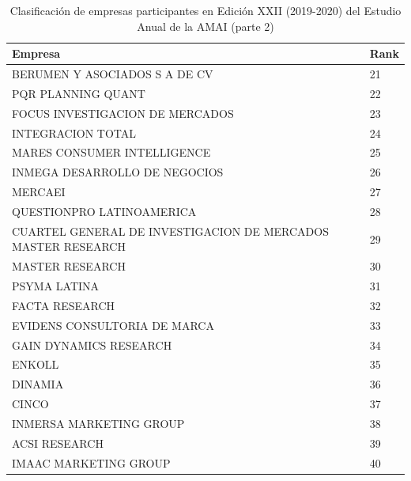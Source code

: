 \begin{table}[]
\caption{Clasificación de empresas participantes en Edición XXII (2019-2020) del Estudio Anual de la AMAI (parte 2)}
\label{tab:clasificación2}
\begin{tabular}{|l|l|}
\hline
Empresa                                                      & Rank \\ \hline
BERUMEN Y ASOCIADOS S A DE CV                                & 21   \\ \hline
PQR PLANNING QUANT                                           & 22   \\ \hline
FOCUS INVESTIGACION DE MERCADOS                              & 23   \\ \hline
INTEGRACION TOTAL                                            & 24   \\ \hline
MARES CONSUMER INTELLIGENCE                                  & 25   \\ \hline
INMEGA DESARROLLO DE NEGOCIOS                                & 26   \\ \hline
MERCAEI                                                      & 27   \\ \hline
QUESTIONPRO LATINOAMERICA                                    & 28   \\ \hline
\parbox[t]{11cm}{CUARTEL GENERAL DE INVESTIGACION DE MERCADOS MASTER RESEARCH \vspace{0.1cm}} & 29   \\ \hline
MASTER RESEARCH                                              & 30   \\ \hline
PSYMA LATINA                                                 & 31   \\ \hline
FACTA RESEARCH                                               & 32   \\ \hline
EVIDENS CONSULTORIA DE MARCA                                 & 33   \\ \hline
GAIN DYNAMICS RESEARCH                                       & 34   \\ \hline
ENKOLL                                                       & 35   \\ \hline
DINAMIA                                                      & 36   \\ \hline
CINCO                                                        & 37   \\ \hline
INMERSA MARKETING GROUP                                      & 38   \\ \hline
ACSI RESEARCH                                                & 39   \\ \hline
IMAAC MARKETING GROUP                                        & 40   \\ \hline
\end{tabular}
\end{table}

